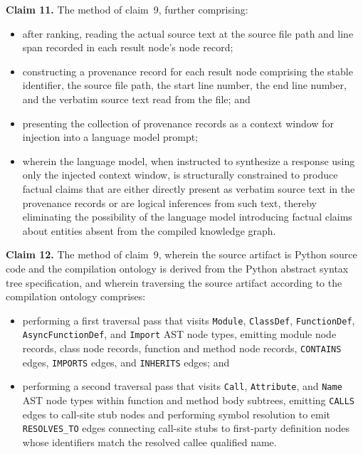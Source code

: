 \documentclass[12pt]{article}
\begin{document}
\bigskip
\noindent\textbf{Claim 11.}\quad
The method of claim~9, further comprising:
\begin{itemize}[leftmargin=2.5em]
  \item after ranking, reading the actual source text at the source file path and
    line span recorded in each result node's node record;
  \item constructing a provenance record for each result node comprising the
    stable identifier, the source file path, the start line number, the end line
    number, and the verbatim source text read from the file; and
  \item presenting the collection of provenance records as a context window for
    injection into a language model prompt;
  \item wherein the language model, when instructed to synthesize a response using
    only the injected context window, is structurally constrained to produce
    factual claims that are either directly present as verbatim source text in
    the provenance records or are logical inferences from such text, thereby
    eliminating the possibility of the language model introducing factual claims
    about entities absent from the compiled knowledge graph.
\end{itemize}

\bigskip
\noindent\textbf{Claim 12.}\quad
The method of claim~9, wherein the source artifact is Python source code and the
compilation ontology is derived from the Python abstract syntax tree
specification, and wherein traversing the source artifact according to the
compilation ontology comprises:
\begin{itemize}[leftmargin=2.5em]
  \item performing a first traversal pass that visits \texttt{Module},
    \texttt{ClassDef}, \texttt{FunctionDef}, \texttt{AsyncFunctionDef}, and
    \texttt{Import} AST node types, emitting module node records, class node
    records, function and method node records, \texttt{CONTAINS} edges,
    \texttt{IMPORTS} edges, and \texttt{INHERITS} edges; and
  \item performing a second traversal pass that visits \texttt{Call},
    \texttt{Attribute}, and \texttt{Name} AST node types within function and
    method body subtrees, emitting \texttt{CALLS} edges to call-site stub nodes
    and performing symbol resolution to emit \texttt{RESOLVES\_TO} edges
    connecting call-site stubs to first-party definition nodes whose identifiers
    match the resolved callee qualified name.
\end{itemize}
\end{document}
